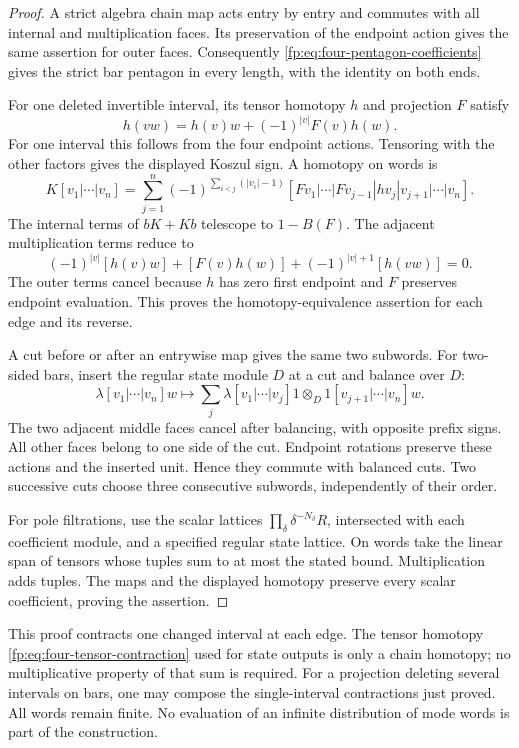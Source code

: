\begin{proof}
A strict algebra chain map acts entry by entry and commutes with
all internal and multiplication faces.  Its preservation of the
endpoint action gives the same assertion for outer faces.
Consequently \eqref{fp:eq:four-pentagon-coefficients} gives the strict
bar pentagon in every length, with the identity on both ends.

For one deleted invertible interval, its tensor homotopy \(h\)
and projection \(F\) satisfy
\[
 h(vw)=h(v)w+(-1)^{|v|}F(v)h(w).
\]
For one interval this follows from the four endpoint actions.
Tensoring with the other factors gives the displayed Koszul sign.
A homotopy on words is
\[
 K[v_1|\cdots|v_n]=
 \sum_{j=1}^n(-1)^{\sum_{i<j}(|v_i|-1)}
 [Fv_1|\cdots|Fv_{j-1}|hv_j|v_{j+1}|\cdots|v_n].
\]
The internal terms of \(bK+Kb\) telescope to \(1-B(F)\).
The adjacent multiplication terms reduce to
\[
 (-1)^{|v|}[h(v)w]+[F(v)h(w)]
       +(-1)^{|v|+1}[h(vw)]=0.
\]
The outer terms cancel because \(h\) has zero first endpoint
and \(F\) preserves endpoint evaluation.  This proves the
homotopy-equivalence assertion for each edge and its reverse.

A cut before or after an entrywise map gives the same two
subwords.  For two-sided bars, insert the regular state module \(D\)
at a cut and balance over \(D\):
\[
 \lambda[v_1|\cdots|v_n]w\longmapsto
 \sum_j\lambda[v_1|\cdots|v_j]1
 \otimes_D1[v_{j+1}|\cdots|v_n]w.
\]
The two adjacent middle faces cancel after balancing, with opposite
prefix signs.  All other faces belong to one side of the cut.
Endpoint rotations preserve these actions and the inserted unit.
Hence they commute with balanced cuts.  Two successive cuts choose
three consecutive subwords, independently of their order.

For pole filtrations, use the scalar lattices
\(\prod_\delta\delta^{-N_\delta}R\), intersected with each
coefficient module, and a specified regular state lattice.  On words
take the linear span of tensors whose tuples sum to at most the
stated bound.  Multiplication adds tuples.  The maps and the displayed
homotopy preserve every scalar coefficient, proving the assertion.
\end{proof}

This proof contracts one changed interval at each edge.  The tensor
homotopy \eqref{fp:eq:four-tensor-contraction} used for state outputs
is only a chain homotopy; no multiplicative property of that sum
is required.  For a projection deleting several intervals on bars,
one may compose the single-interval contractions just proved.
All words remain finite.  No evaluation of an infinite distribution
of mode words is part of the construction.

